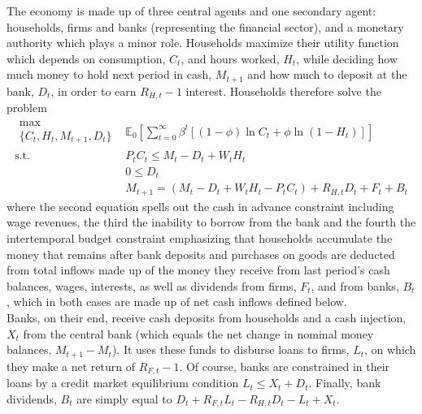 The economy is made up of three central agents and one secondary agent: households, firms and banks (representing the financial sector), and a monetary authority which plays a minor role. Households maximize their utility function which depends on consumption, $C_t$, and hours worked, $H_t$, while deciding how much money to hold next period in cash, $M_{t+1}$ and how much to deposit at the bank, $D_t$, in order to earn $R_{H,t}-1$ interest. Households therefore solve the problem
\begin{eqnarray*}
\substack{\max \\ \{C_t,H_t,M_{t+1},D_t\}} & \mathbb{E}_0 \left[ \sum_{t=0}^\infty \beta^t \left[ (1-\phi) \ln C_t + \phi \ln (1-H_t) \right] \right] \\
\textrm{s.t.} & P_t C_t \leq M_t - D_t + W_t H_t \\
& 0 \leq D_t \\
& M_{t+1} = (M_t - D_t + W_tH_t - P_tC_t) + R_{H,t}D_t + F_t + B_t
\end{eqnarray*}
where the second equation spells out the cash in advance constraint including wage revenues, the third the inability to borrow from the bank and the fourth the intertemporal budget constraint emphasizing that households accumulate the money that remains after bank deposits and purchases on goods are deducted from total inflows made up of the money they receive from last period's cash balances, wages, interests, as well as dividends from firms, $F_t$, and from banks, $B_t$, which in both cases are made up of net cash inflows defined below. \\

Banks, on their end, receive cash deposits from households and a cash injection, $X_t$ from the central bank (which equals the net change in nominal money balances, $M_{t+1}-M_t$). It uses these funds to disburse loans to firms, $L_t$, on which they make a net return of $R_{F,t}-1$. Of course, banks are constrained in their loans by a credit market equilibrium condition $L_t \leq X_t + D_t$. Finally, bank dividends, $B_t$ are simply equal to $D_t + R_{F,t}L_t - R_{H,t}D_t - L_t + X_t$. \\

